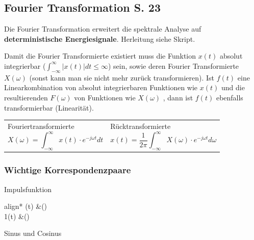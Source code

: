 \subsection{Fourier Transformation S. 23}
Die Fourier Transformation erweitert die spektrale Analyse auf \textbf{deterministische Energiesignale}. Herleitung siehe Skript.

Damit die Fourier Transformierte existiert muss die Funktion $x(t)$ absolut integrierbar ($\int_{-\infty}^{\infty} |x(t)| dt \leq \infty$) sein, sowie deren Fourier Transformierte $X(\omega)$ (sonst kann man sie nicht mehr zurück transformieren). Ist $f(t)$ eine Linearkombination von absolut integrierbaren Funktionen wie $x(t)$ und die resultierenden $F(\omega)$ von Funktionen wie $X(\omega)$ , dann ist $f(t)$ ebenfalls transformierbar (Linearität).
\begin{table}[H]
	\begin{tabularx}{\textwidth}{X X}
		\begin{minipage}{\linewidth}
			Fouriertransformierte
			\begin{equation*}
				X(\omega) = \int_{-\infty}^{\infty} x(t) \cdot e^{-j\omega t}dt
			\end{equation*}
		\end{minipage}
		&
		\begin{minipage}{\linewidth}
			Rücktransformierte
			\begin{equation*}
				x(t) = \frac{1}{2\pi}\int_{-\infty}^{\infty} X(\omega) \cdot e^{-j\omega t}d\omega
			\end{equation*}
	\end{minipage}
	\end{tabularx}
\end{table}

\subsubsection{Wichtige Korrespondenzpaare}
\begin{minipage}{4cm}
	Impulsfunktion
	\begin{empheq}[box={\fboxsep=6pt\fbox}]{align*}
		\delta(t) \;\; &\Laplace \;(\omega) \\
		1(t) \;\; &\Laplace \;\pi\delta(\omega)
	\end{empheq}
\end{minipage}
\begin{minipage}{8cm}
	Sinus und Cosinus
\end{minipage}


